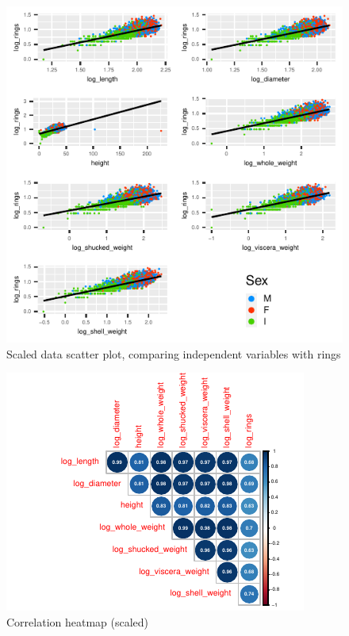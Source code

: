 \documentclass[a4paper,9pt,twocolumn,twoside,]{pinp}
\begin{document}
\begin{figure}

{\centering \includegraphics{005E06-Project-Report_files/figure-latex/scaled_scatter-1} 

}

\caption{Scaled data scatter plot, comparing independent variables with rings}\label{fig:scaled_scatter}
\end{figure}

\begin{figure}

{\centering \includegraphics{005E06-Project-Report_files/figure-latex/correlation_matrix-1} 

}

\caption{Correlation heatmap (scaled)}\label{fig:correlation_matrix}
\end{figure}
\end{document}
